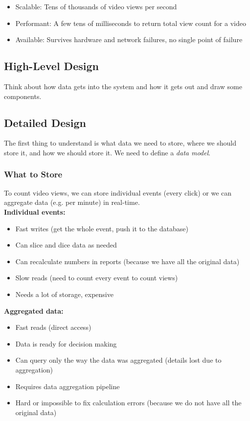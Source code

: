 \documentclass[12pt, titlepage]{article}
\begin{document}
\begin{itemize}
  \item Scalable: Tens of thousands of video views per second
  \item Performant: A few tens of milliseconds to return total view count for a video
  \item Available: Survives hardware and network failures, no single point of failure
\end{itemize}

\subsection{High-Level Design}

Think about how data gets into the system and how it gets out and draw some components.

\subsection{Detailed Design}

The first thing to understand is what data we need to store, where we should store it, and how we should store it. We need to define a \textit{data model}.

\subsubsection{What to Store}

To count video views, we can store individual events (every click) or we can aggregate data (e.g. per minute) in real-time. \\

\textbf{Individual events:}
\begin{itemize}
  \item Fast writes (get the whole event, push it to the database)
  \item Can slice and dice data as needed
  \item Can recalculate numbers in reports (because we have all the original data)
  \item Slow reads (need to count every event to count views)
  \item Needs a lot of storage, expensive \\
\end{itemize}

\textbf{Aggregated data:}
\begin{itemize}
  \item Fast reads (direct access)
  \item Data is ready for decision making
  \item Can query only the way the data was aggregated (details lost due to aggregation)
  \item Requires data aggregation pipeline
  \item Hard or impossible to fix calculation errors (because we do not have all the original data)
\end{itemize}
\end{document}
